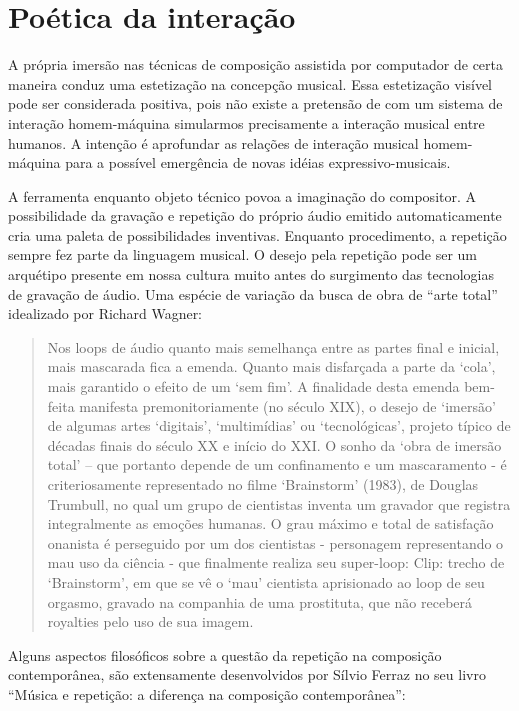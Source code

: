 \documentclass{ppgmus}
\begin{document}
\section{Poética da interação}


A própria imersão nas técnicas de composição assistida por computador de certa
maneira conduz uma estetização na concepção musical. Essa estetização visível
pode ser considerada positiva, pois não existe a pretensão de com um sistema 
de interação homem-máquina simularmos precisamente a interação musical entre
humanos. A intenção é aprofundar as relações de interação musical homem-máquina
para a possível emergência de novas idéias expressivo-musicais. 

A ferramenta enquanto objeto técnico povoa a imaginação do compositor. A possibilidade
da gravação e repetição do próprio áudio emitido automaticamente cria uma paleta de
possibilidades inventivas. Enquanto procedimento, a repetição sempre fez parte da linguagem
musical. O desejo pela repetição pode ser um arquétipo presente em nossa cultura
muito antes do surgimento das tecnologias de gravação de áudio. Uma espécie
de variação da busca de obra de ``arte total'' idealizado por Richard Wagner: 


\begin{quote}
 Nos loops de áudio quanto mais semelhança entre as partes final e inicial, mais mascarada fica a
emenda. Quanto mais disfarçada a parte da ‘cola’, mais garantido o efeito de um ‘sem fim’. A finalidade
desta emenda bem-feita manifesta premonitoriamente (no século XIX), o desejo de ‘imersão’ de algumas
artes ‘digitais’, ‘multimídias’ ou ‘tecnológicas’, projeto típico de décadas finais do século XX e início do
XXI. O sonho da ‘obra de imersão total’ – que portanto depende de um confinamento e um mascaramento -
é criteriosamente representado no filme ‘Brainstorm’ (1983), de Douglas Trumbull, no qual um grupo de
cientistas inventa um gravador que registra integralmente as emoções humanas. O grau máximo e total de
satisfação onanista é perseguido por um dos cientistas - personagem representando o mau uso da ciência -
que finalmente realiza seu super-loop:
Clip: trecho de ‘Brainstorm’, em que se vê o ‘mau’ cientista aprisionado ao loop de seu orgasmo, gravado na
companhia de uma prostituta, que não receberá royalties pelo uso de sua imagem. \cite{caesarloop}
\end{quote} 

Alguns aspectos filosóficos sobre a questão da repetição na composição contemporânea,
são extensamente desenvolvidos por Sílvio Ferraz no seu livro 
``Música e repetição: a diferença na composição contemporânea'':
 
\end{document}
